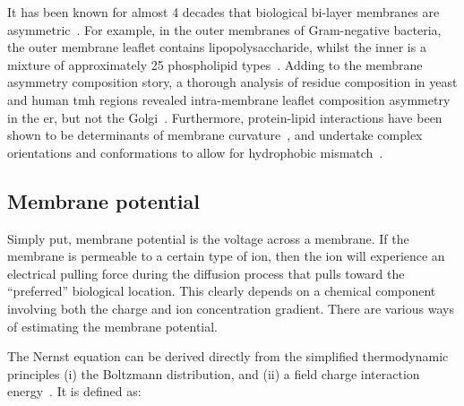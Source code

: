 
It has been known for almost 4 decades that biological bi\--layer membranes are asymmetric~\cite{Singer1972, OpdenKamp1979}.
For example, in the outer membranes of Gram-negative bacteria, the outer membrane leaflet contains lipopolysaccharide, whilst the inner is a mixture of approximately 25 phospholipid types~\cite{VanMeer2008}.
Adding to the membrane asymmetry composition story, a thorough analysis of residue composition in yeast and human \gls{tmh} regions revealed intra-membrane leaflet composition asymmetry in the \gls{er}, but not the Golgi~\cite{Sharpe2010}.
Furthermore, protein-lipid interactions have been shown to be determinants of membrane curvature~\cite{Jensen2004}, and undertake complex orientations and conformations to allow for hydrophobic mismatch~\cite{Planque2003}.


\subsection{Membrane potential}
Simply put, membrane potential is the voltage across a membrane.
If the membrane is permeable to a certain type of ion, then the ion will experience an electrical pulling force during the diffusion process that pulls toward the ``preferred'' biological location.
This clearly depends on a chemical component involving both the charge and ion concentration gradient.
There are various ways of estimating the membrane potential.

The Nernst equation can be derived directly from the simplified thermodynamic principles (i) the Boltzmann distribution, and (ii) a field charge interaction energy~\cite{Feiner1994}.
It is defined as:

